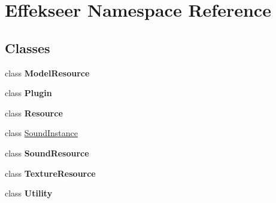 \hypertarget{namespace_effekseer}{}\section{Effekseer Namespace Reference}
\label{namespace_effekseer}
\subsection*{Classes}
\begin{DoxyCompactItemize}
\item 
class {\bfseries Model\+Resource}
\item 
class {\bfseries Plugin}
\item 
class {\bfseries Resource}
\item 
class \hyperlink{class_effekseer_1_1_sound_instance}{Sound\+Instance}
\item 
class {\bfseries Sound\+Resource}
\item 
class {\bfseries Texture\+Resource}
\item 
class {\bfseries Utility}
\end{DoxyCompactItemize}

